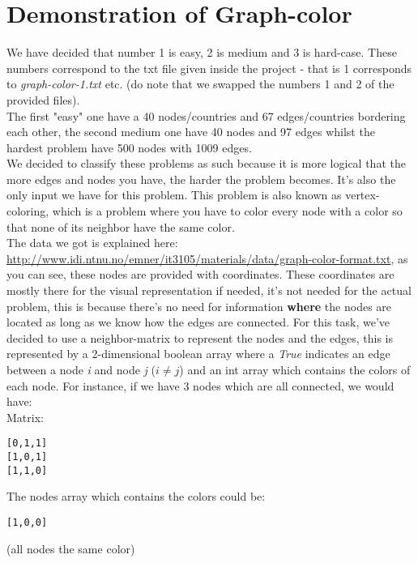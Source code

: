 \documentclass[12pt, a4paper]{article}
\begin{document}
\section{Demonstration of Graph-color}
We have decided that number 1 is easy, 2 is medium and 3 is hard-case.  These numbers correspond to the txt file given inside the project - that is 1 corresponds to \textit{graph-color-1.txt} etc. (do note that we swapped the numbers 1 and 2 of the provided files).\\
The first "easy" one have a 40 nodes/countries and 67 edges/countries bordering each other, the second medium one have 40 nodes and 97 edges whilst the hardest problem have 500 nodes with 1009 edges.\\ 
We decided to classify these problems as such because it is more logical that the more edges and nodes you have, the harder the problem becomes. It's also the only input we have for this problem.
This problem is also known as vertex-coloring, which is a problem where you have to color every node with a color so that none of its neighbor have the same color.\\
The data we got is explained here:\\ \href{http://www.idi.ntnu.no/emner/it3105/materials/data/graph-color-format.txt}{http://www.idi.ntnu.no/emner/it3105/materials/data/graph-color-format.txt},
as you can see, these nodes are provided with coordinates. These coordinates are mostly there for the visual representation if needed, it's not needed for the actual problem, this is because there's no need for information \textbf{where} the nodes are located as long as we know how the edges are connected. For this task, we've decided to use a neighbor-matrix to represent the nodes and the edges, this is represented by a 2-dimensional boolean array where a \textit{True} indicates an edge between a node \textit{i} and node \textit{j} ($i \neq j$) and an int array which contains the colors of each node. For instance, if we have 3 nodes which are all connected, we would have:\\
Matrix:\\
\begin{center}
\begin{verbatim}
[0,1,1]
[1,0,1]
[1,1,0]
\end{verbatim}
\end{center}
The nodes array which contains the colors could be:
\begin{center}
\begin{verbatim}
[1,0,0]
\end{verbatim}
\end{center} (all nodes the same color)\\
\end{document}
